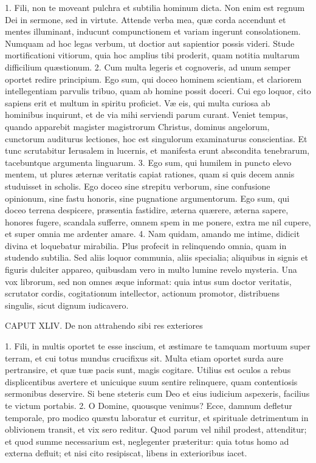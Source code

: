 1. Fili, non te moveant pulchra et subtilia hominum dicta. Non enim est regnum Dei in sermone, sed in virtute. Attende verba mea, quæ corda accendunt et mentes illuminant, inducunt compunctionem et variam ingerunt consolationem. Numquam ad hoc legas verbum, ut doctior aut sapientior possis videri. Stude mortificationi vitiorum, quia hoc amplius tibi proderit, quam notitia multarum difficilium quæstionum.
2. Cum multa legeris et cognoveris, ad unum semper oportet redire principium. Ego sum, qui doceo hominem scientiam, et clariorem intellegentiam parvulis tribuo, quam ab homine possit doceri. Cui ego loquor, cito sapiens erit et multum in spiritu proficiet. Væ eis, qui multa curiosa ab hominibus inquirunt, et de via mihi serviendi parum curant. Veniet tempus, quando apparebit magister magistrorum Christus, dominus angelorum, cunctorum auditurus lectiones, hoc est singulorum examinaturus conscientias. Et tunc scrutabitur Ierusalem in lucernis, et manifesta erunt abscondita tenebrarum, tacebuntque argumenta linguarum.
3. Ego sum, qui humilem in puncto elevo mentem, ut plures æternæ veritatis capiat rationes, quam si quis decem annis studuisset in scholis. Ego doceo sine strepitu verborum, sine confusione opinionum, sine fastu honoris, sine pugnatione argumentorum. Ego sum, qui doceo terrena despicere, præsentia fastidire, æterna quærere, æterna sapere, honores fugere, scandala sufferre, omnem spem in me ponere, extra me nil cupere, et super omnia me ardenter amare.
4. Nam quidam, amando me intime, didicit divina et loquebatur mirabilia. Plus profecit in relinquendo omnia, quam in studendo subtilia. Sed aliis loquor communia, aliis specialia; aliquibus in signis et figuris dulciter appareo, quibusdam vero in multo lumine revelo mysteria. Una vox librorum, sed non omnes æque informat: quia intus sum doctor veritatis, scrutator cordis, cogitationum intellector, actionum promotor, distribuens singulis, sicut dignum iudicavero.


CAPUT XLIV.
De non attrahendo sibi res exteriores

1. Fili, in multis oportet te esse inscium, et æstimare te tamquam mortuum super terram, et cui totus mundus crucifixus sit. Multa etiam oportet surda aure pertransire, et quæ tuæ pacis sunt, magis cogitare. Utilius est oculos a rebus displicentibus avertere et unicuique suum sentire relinquere, quam contentiosis sermonibus deservire. Si bene steteris cum Deo et eius iudicium aspexeris, facilius te victum portabis.
2. O Domine, quousque venimus? Ecce, damnum defletur temporale, pro modico quæstu laboratur et curritur, et spirituale detrimentum in oblivionem transit, et vix sero reditur. Quod parum vel nihil prodest, attenditur; et quod summe necessarium est, neglegenter præteritur: quia totus homo ad externa defluit; et nisi cito resipiscat, libens in exterioribus iacet.


